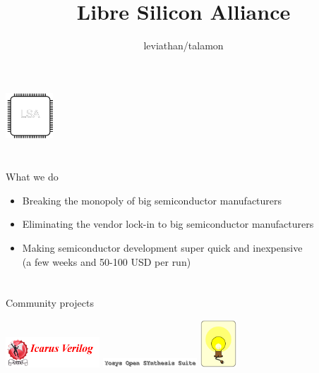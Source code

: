 \documentclass[9pt]{beamer}
\author{leviathan/talamon}
\title{Libre Silicon Alliance}
\begin{document}
\begin{frame}
	\titlepage
	\begin{center}
		\includegraphics[width=50pt,height=50pt]{lsa.png}
	\end{center}
\end{frame}


\section[What]{}
\begin{frame}{What we do}
	\begin{itemize}
		\item Breaking the monopoly of big semiconductor manufacturers
		\item Eliminating the vendor lock-in to big semiconductor manufacturers
		\item Making semiconductor development super quick and inexpensive \\ (a few weeks and 50-100 USD per run)
	\end{itemize}
\end{frame}

\section[Who]{}
\begin{frame}{Community projects}
	\begin{center}
		\includegraphics[width=100pt]{Icarus.png}
		\includegraphics[width=100pt]{Yosys.png}
		\includegraphics[height=50pt]{Opencircuit.png}
	\end{center}
\end{frame}
\end{document}
